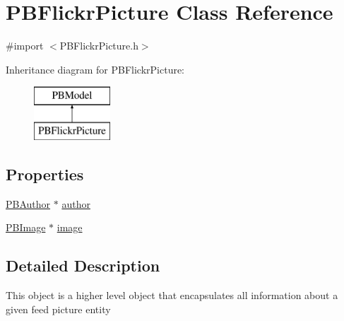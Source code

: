 \hypertarget{interface_p_b_flickr_picture}{
\section{PBFlickrPicture Class Reference}
\label{interface_p_b_flickr_picture}
}


{\ttfamily \#import $<$PBFlickrPicture.h$>$}

Inheritance diagram for PBFlickrPicture:\begin{figure}[H]
\begin{center}
\leavevmode
\includegraphics[height=2cm]{interface_p_b_flickr_picture}
\end{center}
\end{figure}
\subsection*{Properties}
\begin{DoxyCompactItemize}
\item 
\hyperlink{interface_p_b_author}{PBAuthor} $\ast$ \hyperlink{interface_p_b_flickr_picture_af262e29a252b8ee672fa7bafb4f1168a}{author}
\item 
\hyperlink{interface_p_b_image}{PBImage} $\ast$ \hyperlink{interface_p_b_flickr_picture_af302f7b0dab3ec4ef87f21c52d431152}{image}
\end{DoxyCompactItemize}


\subsection{Detailed Description}
This object is a higher level object that encapsulates all information about a given feed picture entity 

